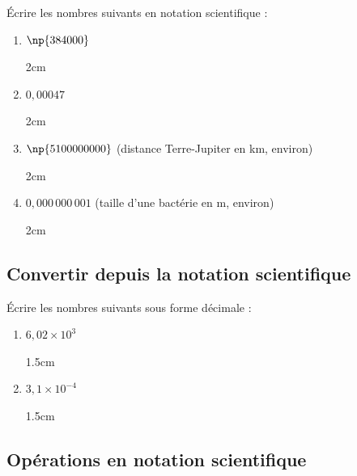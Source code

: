 \documentclass[a4paper]{book}
\begin{document}
    \begin{exemple}
        Écrire les nombres suivants en notation scientifique :
        \begin{enumerate}
            \item $\np{384000}$
            \begin{ZoneReponse}{2cm}
            \end{ZoneReponse}

            \item $0{,}00047$
            \begin{ZoneReponse}{2cm}
            \end{ZoneReponse}

            \item $\np{5100000000}$ \quad (distance Terre-Jupiter en km, environ)
            \begin{ZoneReponse}{2cm}
            \end{ZoneReponse}

            \item $0{,}000\,000\,001$ \quad (taille d'une bactérie en m, environ)
            \begin{ZoneReponse}{2cm}
            \end{ZoneReponse}
        \end{enumerate}
    \end{exemple}


\subsection{Convertir depuis la notation scientifique}

    \begin{exemple}
        Écrire les nombres suivants sous forme décimale :
        \begin{enumerate}
            \item $6{,}02 \times 10^3$
            \begin{ZoneReponse}{1.5cm}
            \end{ZoneReponse}

            \item $3{,}1 \times 10^{-4}$
            \begin{ZoneReponse}{1.5cm}
            \end{ZoneReponse}
        \end{enumerate}
    \end{exemple}


\subsection{Opérations en notation scientifique}
 
\end{document}
